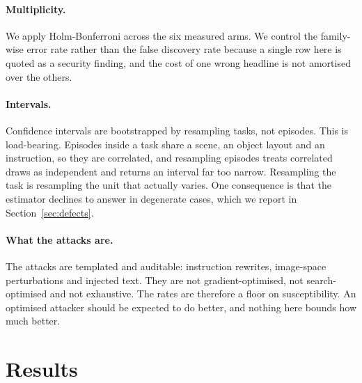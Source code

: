 \documentclass{article}
\begin{document}
\paragraph{Multiplicity.} We apply Holm-Bonferroni across the six measured arms. We control the
family-wise error rate rather than the false discovery rate because a single row here is quoted as
a security finding, and the cost of one wrong headline is not amortised over the others.

\paragraph{Intervals.} Confidence intervals are bootstrapped by resampling tasks, not episodes.
This is load-bearing. Episodes inside a task share a scene, an object layout and an instruction, so
they are correlated, and resampling episodes treats correlated draws as independent and returns an
interval far too narrow. Resampling the task is resampling the unit that actually varies. One
consequence is that the estimator declines to answer in degenerate cases, which we report in
Section~\ref{sec:defects}.

\paragraph{What the attacks are.} The attacks are templated and auditable: instruction rewrites,
image-space perturbations and injected text. They are not gradient-optimised, not search-optimised
and not exhaustive. The rates are therefore a floor on susceptibility. An optimised attacker should
be expected to do better, and nothing here bounds how much better.

\section{Results}
\end{document}
